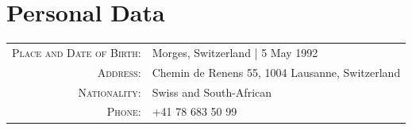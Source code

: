 \documentclass[a4paper,11pt]{article} %
\begin{document}

\section{Personal Data}
\begin{center}
\begin{tabular}{rl}
\textsc{Place and Date of Birth:} & Morges, Switzerland  | 5 May 1992 \\
\textsc{Address:} & Chemin de Renens 55, 1004 Lausanne, Switzerland \\
\textsc{Nationality:} & Swiss and South-African \\
\textsc{Phone:} & +41 78 683 50 99\\
\end{tabular}
\end{center}
\end{document}
